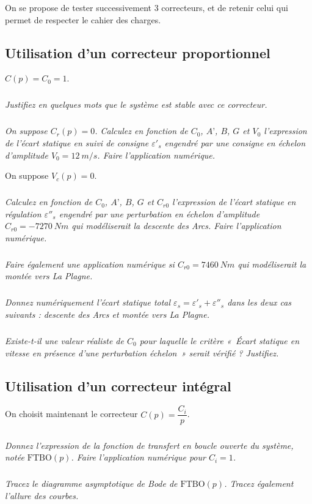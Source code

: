 \documentclass[10pt,fleqn]{article} %
\begin{document}
\begin{multicols}{2}
	
On se propose de tester successivement 3 correcteurs, et de retenir celui qui permet de respecter le cahier des charges.

\subsection*{Utilisation d'un correcteur proportionnel}
$C(p)=C_0=1$.


\subparagraph{}
\textit{Justifiez en quelques mots que le système est stable avec ce correcteur.}

\subparagraph{}
\textit{On suppose $C_r(p)=0$. Calculez en fonction de $C_0$, $A’$, $B$, $G$ et $V_0$ l’expression de l’écart statique en suivi de consigne $\varepsilon'_s$ engendré par une consigne en échelon d’amplitude $V_0=\SI{12}{m/s}$. Faire l’application numérique.}

\vspace{.5cm}

On suppose $V_c(p)=0$.
\subparagraph{}
\textit{Calculez en fonction de $C_0$, $A’$, $B$, $G$ et $C_{r0}$ l’expression de l’écart statique en régulation $\varepsilon''_s$ engendré par une perturbation en échelon d’amplitude $C_{r0}=\SI{-7270}{Nm}$ qui modéliserait la descente des Arcs. Faire l’application numérique.}

\subparagraph{}
\textit{Faire également une application numérique si $C_{r0}=\SI{7460}{Nm}$ qui modéliserait la montée vers La Plagne.}

\subparagraph{}
\textit{Donnez numériquement l’écart statique total $\varepsilon_s=\varepsilon'_s+ \varepsilon''_s$  dans les deux cas suivants : descente des Arcs et montée vers La Plagne.}

\subparagraph{}
\textit{Existe-t-il une valeur réaliste de $C_0$ pour laquelle le critère «~Écart statique en vitesse en présence d’une perturbation échelon~» serait vérifié ? Justifiez.}


\subsection*{Utilisation d'un correcteur intégral}

On choisit maintenant le correcteur $C(p)=\dfrac{C_i}{p}$.

\subparagraph{}
\textit{Donnez l’expression de la fonction de transfert en boucle ouverte du système, notée $\text{FTBO}(p)$. Faire l’application numérique pour $C_i=1$.}

\subparagraph{}
\textit{Tracez le diagramme asymptotique de Bode de $\text{FTBO}(p)$. Tracez également l’allure des courbes.}


\end{multicols}
\end{document}
